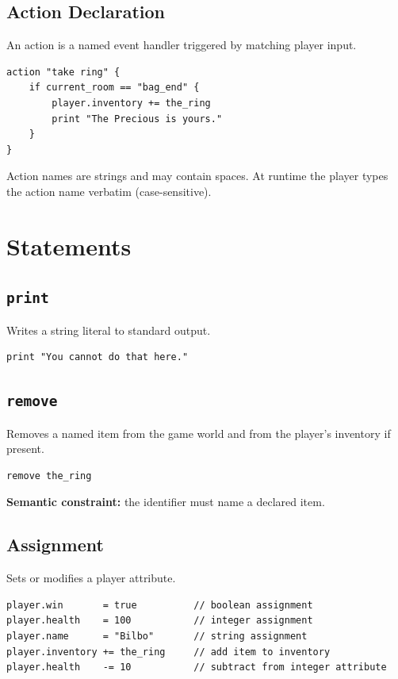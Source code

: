 \documentclass[12pt, a4paper]{article}
\begin{document}
\subsection{Action Declaration}

An action is a named event handler triggered by matching player input.

\begin{lstlisting}[style=dc, caption={Action declaration syntax}]
action "take ring" {
    if current_room == "bag_end" {
        player.inventory += the_ring
        print "The Precious is yours."
    }
}
\end{lstlisting}

Action names are strings and may contain spaces. At runtime the player types the action
name verbatim (case-sensitive).

\section{Statements}

\subsection{\texttt{print}}
Writes a string literal to standard output.
\begin{lstlisting}[style=dc, numbers=none]
print "You cannot do that here."
\end{lstlisting}

\subsection{\texttt{remove}}
Removes a named item from the game world and from the player's inventory if present.
\begin{lstlisting}[style=dc, numbers=none]
remove the_ring
\end{lstlisting}
\textbf{Semantic constraint:} the identifier must name a declared item.

\subsection{Assignment}
Sets or modifies a player attribute.

\begin{lstlisting}[style=dc, numbers=none, caption={Assignment variants}]
player.win       = true          // boolean assignment
player.health    = 100           // integer assignment
player.name      = "Bilbo"       // string assignment
player.inventory += the_ring     // add item to inventory
player.health    -= 10           // subtract from integer attribute
\end{lstlisting}
\end{document}
